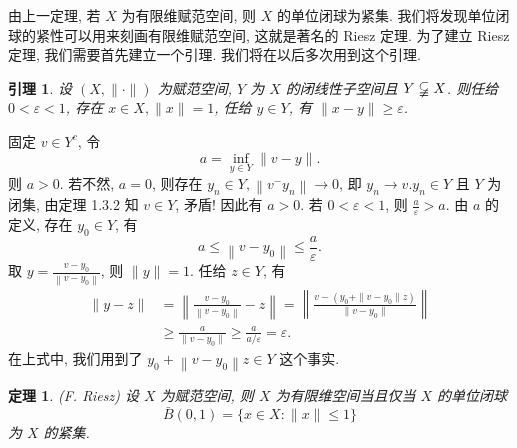 \documentclass[openany]{ctexbook}
\makeatletter
\theoremstyle{kaiti}
\newtheorem{theorem}{定理}[section]
\newtheorem{lemma}{引理}[section]
\theoremstyle{normal}
\renewenvironment{proof}[1][\proofname]{\par
    \pushQED{\qed}%
    \normalfont \topsep6\p@\@plus6\p@\relax
    \trivlist
    \item\relax
    {\heiti #1}\hspace{2\labelsep}\ignorespaces
  }{%
    \popQED\endtrivlist\@endpefalse
  }
\makeatother
\begin{document}
由上一定理, 若 $X$ 为有限维赋范空间, 则 $X$ 的单位闭球为紧集. 我们将发现单位闭球的紧性可以用来刻画有限维赋范空间, 这就是著名的 Riesz 定理. 为了建立 Riesz定理, 我们需要首先建立一个引理. 我们将在以后多次用到这个引理.

\begin{lemma}
  设 $(X,\|\cdot\|)$ 为赋范空间, $Y$ 为 $X$ 的闭线性子空间且 $Y \varsubsetneqq X$. 则任给 $0<\varepsilon<1$, 存在 $x \in X,\|x\|=1$, 任给 $y \in Y$, 有 $\|x-y\| \geqslant \varepsilon$.
\end{lemma}

\begin{proof}
固定 $v \in Y^{c}$, 令
$$
a=\inf_{y \in Y}\|v-y\|.
$$
则 $a>0$. 若不然, $a=0$, 则存在 $y_n \in Y,\left\|v^{-} y_n\right\| \rightarrow 0$, 即 $y_n \rightarrow v. y_n \in Y$ 且 $Y$ 为闭集, 由定理 1.3.2 知 $v \in Y$, 矛盾! 因此有 $a>0$. 若 $0<\varepsilon<1$, 则 $\frac{a}{\varepsilon}>a$. 由 $a$ 的定义, 存在 $y_0 \in Y$, 有
$$
a \leqslant\left\|v-y_0\right\| \leqslant \frac{a}{\varepsilon}.
$$
取 $y=\frac{v-y_0}{\left\|v-y_0\right\|}$, 则 $\|y\|=1$. 任给 $z \in Y$, 有
$$
  \begin{aligned}
    \|y-z\| 
    &=\left\|\frac{v-y_0}{\left\|v-y_0\right\|}-z\right\|=\left\|\frac{v-(y_0+\|v-y_0\|z)}{\|v-y_0\|}\right\|\\
    &\geqslant\frac{a}{\|v-y_0\|} \geqslant \frac{a}{a/\varepsilon}=\varepsilon.
  \end{aligned}
$$
在上式中, 我们用到了 $y_0+\left\|v-y_0\right\| z \in Y$ 这个事实.
\end{proof}

\begin{theorem}
(F. Riesz) 设 $X$ 为赋范空间, 则 $X$ 为有限维空间当且仅当 $X$ 的单位闭球
$$
\bar{B}(0,1)=\{x \in X:\|x\| \leqslant 1\}
$$
为 $X$ 的紧集.
\end{theorem}
\end{document}
